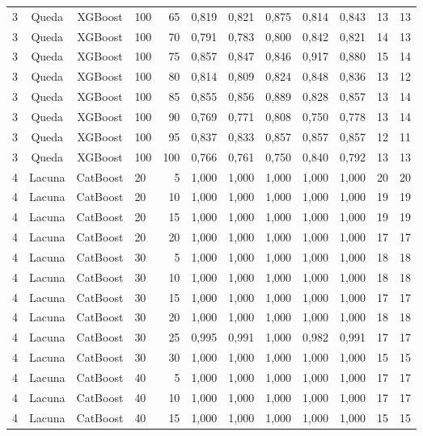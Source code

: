 \begin{longtable}{ccclrrrrrrrr}
3 & Queda & XGBoost & 100 & 65 & 0,819 & 0,821 & 0,875 & 0,814 & 0,843 & 13 & 13 \\
3 & Queda & XGBoost & 100 & 70 & 0,791 & 0,783 & 0,800 & 0,842 & 0,821 & 14 & 13 \\
3 & Queda & XGBoost & 100 & 75 & 0,857 & 0,847 & 0,846 & 0,917 & 0,880 & 15 & 14 \\
3 & Queda & XGBoost & 100 & 80 & 0,814 & 0,809 & 0,824 & 0,848 & 0,836 & 13 & 12 \\
3 & Queda & XGBoost & 100 & 85 & 0,855 & 0,856 & 0,889 & 0,828 & 0,857 & 13 & 14 \\
3 & Queda & XGBoost & 100 & 90 & 0,769 & 0,771 & 0,808 & 0,750 & 0,778 & 13 & 14 \\
3 & Queda & XGBoost & 100 & 95 & 0,837 & 0,833 & 0,857 & 0,857 & 0,857 & 12 & 11 \\
3 & Queda & XGBoost & 100 & 100 & 0,766 & 0,761 & 0,750 & 0,840 & 0,792 & 13 & 13 \\
4 & Lacuna & CatBoost & 20 & 5 & 1,000 & 1,000 & 1,000 & 1,000 & 1,000 & 20 & 20 \\
4 & Lacuna & CatBoost & 20 & 10 & 1,000 & 1,000 & 1,000 & 1,000 & 1,000 & 19 & 19 \\
4 & Lacuna & CatBoost & 20 & 15 & 1,000 & 1,000 & 1,000 & 1,000 & 1,000 & 19 & 19 \\
4 & Lacuna & CatBoost & 20 & 20 & 1,000 & 1,000 & 1,000 & 1,000 & 1,000 & 17 & 17 \\
4 & Lacuna & CatBoost & 30 & 5 & 1,000 & 1,000 & 1,000 & 1,000 & 1,000 & 18 & 18 \\
4 & Lacuna & CatBoost & 30 & 10 & 1,000 & 1,000 & 1,000 & 1,000 & 1,000 & 18 & 18 \\
4 & Lacuna & CatBoost & 30 & 15 & 1,000 & 1,000 & 1,000 & 1,000 & 1,000 & 17 & 17 \\
4 & Lacuna & CatBoost & 30 & 20 & 1,000 & 1,000 & 1,000 & 1,000 & 1,000 & 18 & 18 \\
4 & Lacuna & CatBoost & 30 & 25 & 0,995 & 0,991 & 1,000 & 0,982 & 0,991 & 17 & 17 \\
4 & Lacuna & CatBoost & 30 & 30 & 1,000 & 1,000 & 1,000 & 1,000 & 1,000 & 15 & 15 \\
4 & Lacuna & CatBoost & 40 & 5 & 1,000 & 1,000 & 1,000 & 1,000 & 1,000 & 17 & 17 \\
4 & Lacuna & CatBoost & 40 & 10 & 1,000 & 1,000 & 1,000 & 1,000 & 1,000 & 17 & 17 \\
4 & Lacuna & CatBoost & 40 & 15 & 1,000 & 1,000 & 1,000 & 1,000 & 1,000 & 15 & 15 \\

\end{longtable}
